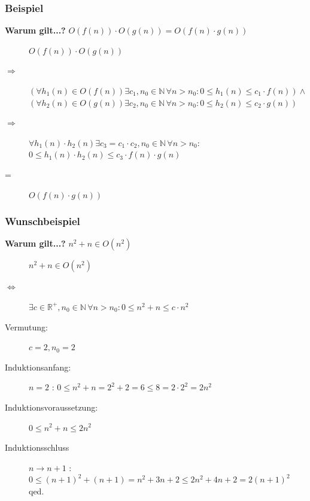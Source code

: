 \begin{frame}
			\frametitle{Beispiel}
		\begin{block}{\bf Warum gilt...?}
		$O(f(n)) \cdot O(g(n)) = O(f(n) \cdot g(n)) $
		\end{block}
		\begin{description}
			\item[] 			$O(f(n)) \cdot O(g(n))$
			\scriptsize
			\item[$\Rightarrow$] $(\forall h_1(n) \in O(f(n)) \exists c_1, n_0 \in \mathbb{N} \,\forall n > n_0 : 0 \leq h_1(n) \leq c_1 \cdot f(n) ) \wedge $\\
								$(\forall h_2(n) \in O(g(n)) \exists c_2, n_0 \in \mathbb{N} \,\forall n > n_0 : 0 \leq h_2(n) \leq c_2 \cdot g(n) )$
			\normalsize
			\item[$\Rightarrow$] $\forall h_1(n)\cdot h_2(n)  \exists c_3 = c_1 \cdot c_2, n_0 \in \mathbb{N} \,\forall n > n_0 :$\\
								 $ 0 \leq h_1(n) \cdot h_2(n) \leq c_3 \cdot f(n) \cdot g(n)$
			\item[=]			$O(f(n) \cdot g(n))$
		\end{description}
\end{frame}

\begin{frame}
			\frametitle{Wunschbeispiel}
		\begin{block}{\bf Warum gilt...?}
		$ n^2 + n \in O(n^2) $
		\end{block}
		\begin{description}
			\item[] $n^2 + n \in O(n^2)$
			\scriptsize
			\item[$\Leftrightarrow$] $ \exists c \in \mathbb{R}^+, n_0 \in \mathbb{N} \,\forall n > n_0 : 0 \leq n^2+n \leq c \cdot n^2 $
			\normalsize
			\item[Vermutung:] $ c = 2, n_0 = 2$
			\item[Induktionsanfang:] $n=2$ : $ 0 \leq n^2+n = 2^2+2 = 6 \leq 8 = 2 \cdot 2^2 = 2n^2$
			\item[Induktionsvoraussetzung:] $0 \leq n^2+n \leq 2n^2$
			\item[Induktionsschluss] $n \rightarrow n+1$ :\\ $ 0 \leq (n+1)^2 + (n+1) = n^2 + 3n + 2 \leq 2n^2 + 4n + 2 = 2(n+1)^2$ qed.
		\end{description}
\end{frame}


